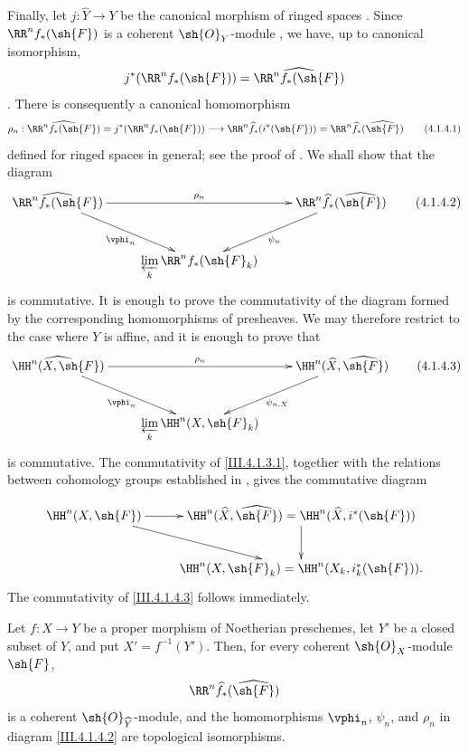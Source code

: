 \begin{env}[4.1.4]
\label{III.4.1.4}
Finally, let $j:\widehat{Y}\to Y$ be the canonical morphism of ringed
spaces .
Since $\RR^n f_*(\sh{F})$ is a coherent $\sh{O}_Y$-module
, we have, up to canonical isomorphism,
\[
  j^*(\RR^n f_*(\sh{F}))
  =
  \widehat{\RR^n f_*(\sh{F})}
\]
.
There is consequently a canonical homomorphism
\[
  \rho_n:
  \widehat{\RR^n f_*(\sh{F})}
  =
  j^*(\RR^n f_*(\sh{F}))
  \longrightarrow
  \RR^n\widehat{f}_*(i^*(\sh{F}))
  =
  \RR^n\widehat{f}_*(\widehat{\sh{F}})
  \tag{4.1.4.1}
  \label{III.4.1.4.1}
\]
defined for ringed spaces in general; see the proof of
.
We shall show that the diagram
\[
  \xymatrix{
    \widehat{\RR^n f_*(\sh{F})}
      \ar[rr]^{\rho_n}\ar[dr]_{\vphi_n}
    &&
    \RR^n\widehat{f}_*(\widehat{\sh{F}})
      \ar[dl]^{\psi_n}\\
    &
    \displaystyle\varprojlim_k\RR^n f_*(\sh{F}_k)
    &
  }
  \tag{4.1.4.2}
  \label{III.4.1.4.2}
\]
is commutative.
It is enough to prove the commutativity of the diagram formed by the
corresponding homomorphisms of presheaves.
We may therefore restrict to the case where $Y$ is affine, and it is
enough to prove that
\[
  \xymatrix{
    \widehat{\HH^n(X,\sh{F})}
      \ar[rr]^{\rho_n}\ar[dr]_{\vphi_n}
    &&
    \HH^n(\widehat{X},\widehat{\sh{F}})
      \ar[dl]^{\psi_{n,X}}\\
    &
    \displaystyle\varprojlim_k\HH^n(X,\sh{F}_k)
    &
  }
  \tag{4.1.4.3}
  \label{III.4.1.4.3}
\]
is commutative.
The commutativity of \eqref{III.4.1.3.1}, together with the relations
between cohomology groups established in , gives the
commutative diagram


\[
  \xymatrix{
    \HH^n(X,\sh{F})
      \ar[r]\ar[dr]
    &
    \HH^n(\widehat{X},\widehat{\sh{F}})
      =
    \HH^n(\widehat{X},i^*(\sh{F}))
      \ar[d]\\
    &
    \HH^n(X,\sh{F}_k)
      =
    \HH^n(X_k,i_k^*(\sh{F})).
  }
\]
The commutativity of \eqref{III.4.1.4.3} follows immediately.
\end{env}

\begin{theorem}[4.1.5]
\label{III.4.1.5}
Let $f:X\to Y$ be a proper morphism of Noetherian preschemes, let
$Y'$ be a closed subset of $Y$, and put $X'=f^{-1}(Y')$.
Then, for every coherent $\sh{O}_X$-module $\sh{F}$,
\[
  \RR^n\widehat{f}_*(\widehat{\sh{F}})
\]
is a coherent $\sh{O}_{\widehat{Y}}$-module, and the homomorphisms
$\vphi_n$, $\psi_n$, and $\rho_n$ in diagram
\eqref{III.4.1.4.2} are topological isomorphisms.
\end{theorem}

